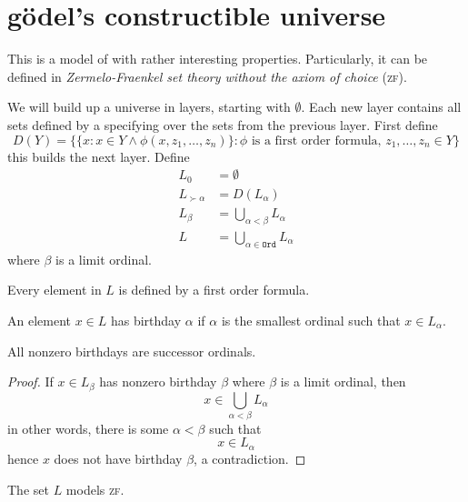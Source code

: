 \documentclass{scrbook}
\newcommand{\ord}{\mathtt{Ord}}
\begin{document}
\section[Gödel's constructible universe]{gödel's constructible universe}
This is a model of \zfc with rather interesting properties. Particularly, it can be defined in \emph{Zermelo-Fraenkel set theory without the axiom of choice} (\textsc{zf}). 
\begin{defn}
  We will build up a universe in layers, starting with $\emptyset$. Each new layer contains all sets defined by a specifying over the sets from the previous layer.
  First define
  \[
  D(Y) = \bigl\{ \{x : x \in Y \wedge \phi(x,z_1,\dots,z_n)\} : \phi \textrm{ is a first order formula, } z_1,\dots,z_n\in Y\bigr\} 
  \]
  this builds the next layer. 
  Define
  \begin{align*}
    L_0 &= \emptyset \\
    L_{\succ \alpha} &= D(L_\alpha) \\
    L_\beta &= \bigcup_{\alpha <\beta} L_\alpha \\
    L &= \bigcup_{\alpha\in \ord} L_\alpha
  \end{align*}
  where $\beta$ is a limit ordinal.

  Every element in $L$ is defined by a first order formula. 
\end{defn}
\begin{defn}[birthday]
  An element $x\in L$ has birthday $\alpha$ if $\alpha$ is the smallest ordinal such that $x\in L_\alpha$. 
\end{defn}
\begin{lemma}
  All nonzero birthdays are successor ordinals.
\end{lemma}
\begin{proof}
  If $x\in L_\beta$ has nonzero birthday $\beta$ where $\beta$ is a limit ordinal, then 
  \[
  x\in \bigcup_{\alpha <\beta} L_\alpha
  \]
  in other words, there is some $\alpha<\beta$ such that
  \[
  x\in L_\alpha
  \]
  hence $x$ does not have birthday $\beta$, a contradiction.
\end{proof}
\begin{theorem}
  The set $L$ models \textsc{zf}.
\end{theorem}
\end{document}
